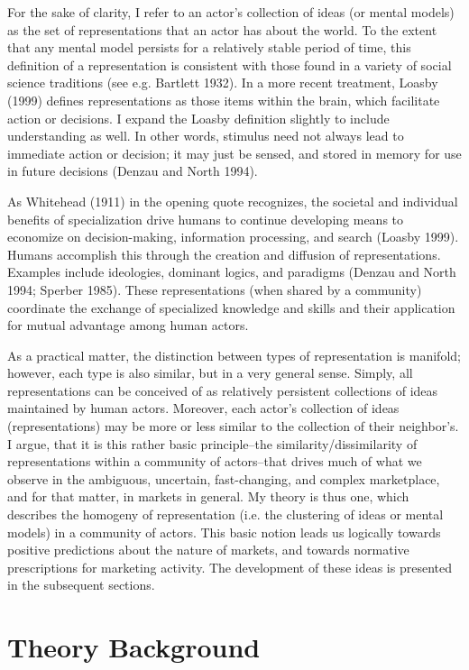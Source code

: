 For the sake of clarity, I refer to an actor's collection of ideas (or mental models) as the set of representations that an actor has about the world. To the extent that any mental model persists for a relatively stable period of time, this definition of a representation is consistent with those found in a variety of social science traditions (see e.g. Bartlett 1932). In a more recent treatment, Loasby (1999) defines representations as those items within the brain, which facilitate action or decisions. I expand the Loasby definition slightly to include understanding as well. In other words, stimulus need not always lead to immediate action or decision; it may just be sensed, and stored in memory for use in future decisions (Denzau and North 1994). 

As Whitehead (1911) in the opening quote recognizes, the societal and individual benefits of specialization drive humans to continue developing means to economize on decision-making, information processing, and search (Loasby 1999). Humans accomplish this through the creation and diffusion of representations. Examples include ideologies, dominant logics, and paradigms (Denzau and North 1994; Sperber 1985). These representations (when shared by a community) coordinate the exchange of specialized knowledge and skills and their application for mutual advantage among human actors. 

As a practical matter, the distinction between types of representation is manifold; however, each type is also similar, but in a very general sense. Simply, all representations can be conceived of as relatively persistent collections of ideas maintained by human actors. Moreover, each actor's collection of ideas (representations) may be more or less similar to the collection of their neighbor's. I argue, that it is this rather basic principle--the similarity/dissimilarity of representations within a community of actors--that drives much of what we observe in the ambiguous, uncertain, fast-changing, and complex marketplace, and for that matter, in markets in general. My theory is thus one, which describes the homogeny of representation (i.e. the clustering of ideas or mental models) in a community of actors. This basic notion leads us logically towards positive predictions about the nature of markets, and towards normative prescriptions for marketing activity. The development of these ideas is presented in the subsequent sections.

\section{Theory Background}

